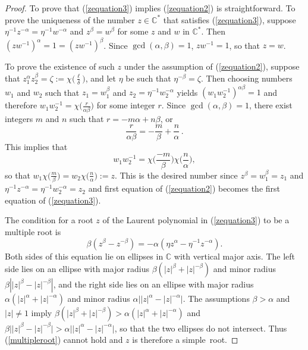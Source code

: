 \documentclass[12pt]{article}
\newcommand{\CC}{\mathbb{C}}
\newcommand{\cchi}[1]{{\textstyle{\chi\big(#1\big)}}}
\begin{document}
\begin{proof}
To prove that (\ref{zequation3}) implies (\ref{zequation2}) is straightforward.
  To prove the uniqueness of the number $z\in\CC^*$ that satisfies (\ref{zequation3}), suppose $\eta^{-1}z^{-\alpha}=\eta^{-1}w^{-\alpha}$ and $z^\beta=w^\beta$ for some $z$ and $w$ in $\CC^*$.  Then $(zw^{-1})^\alpha=1=(zw^{-1})^\beta$.  Since $\gcd(\alpha,\beta)=1$, $zw^{-1}=1$, so that $z=w$.
  
  To prove the existence of such $z$ under the assumption of (\ref{zequation2}), suppose that $z_1^\alpha z_2^\beta=\zeta:=\cchi{\frac{\ell}{\delta}}$, and let $\eta$ be such that $\eta^{-\beta}=\zeta$.  Then choosing numbers $w_1$ and $w_2$ such that $z_1=w_1^\beta$ and $z_2=\eta^{-1}w_2^{-\alpha}$ yields $(w_1w_2^{-1})^{\alpha\beta}=1$ and therefore $w_1w_2^{-1}=\cchi{\frac{r}{\alpha\beta}}$ for some integer $r$.  Since $\gcd(\alpha,\beta)=1$, there exist integers $m$ and $n$ such that $r=-m\alpha + n\beta$, or
%
\begin{equation}
  \frac{r}{\alpha\beta} = -\frac{m}{\beta} + \frac{n}{\alpha}\,.
\end{equation}
%
This implies that
%
\begin{equation}
  w_1w_2^{-1} = \cchi{\frac{-m}{\beta}} \cchi{\frac{n}{\alpha}},
\end{equation}
%
so that $w_1\cchi{\frac{m}{\beta}}=w_2\cchi{\frac{n}{\alpha}}:=z$.  This is the desired number since
$z^\beta=w_1^\beta=z_1$ and $\eta^{-1}z^{-\alpha}=\eta^{-1}w_2^{-\alpha} = z_2$ and first equation of (\ref{zequation2}) becomes the first equation of (\ref{zequation3}).

The condition for a root $z$ of the Laurent polynomial in (\ref{zequation3}) to be a multiple root is
%
\begin{equation}\label{multipleroot}
  \beta\left( z^\beta - z^{-\beta} \right) = -\alpha\left( \eta z^\alpha - \eta^{-1} z^{-\alpha} \right).
\end{equation}
%
Both sides of this equation lie on ellipses in $\CC$ with vertical major axis.
The left side lies on an ellipse with major radius $\beta\left( |z|^\beta + |z|^{-\beta} \right)$ and minor radius $\beta\left| |z|^\beta - |z|^{-\beta} \right|$, and the right side lies on an ellipse with major radius $\alpha\left( |z|^\alpha + |z|^{-\alpha} \right)$ and minor radius $\alpha\big| |z|^\alpha - |z|^{-\alpha} \big|$.  The assumptions $\beta>\alpha$ and $|z|\not=1$ imply
$\beta\left( |z|^\beta + |z|^{-\beta} \right)>\alpha\left( |z|^\alpha + |z|^{-\alpha} \right)$
and $\beta\big| |z|^\beta - |z|^{-\beta} \big|>\alpha\big| |z|^\alpha - |z|^{-\alpha} \big|$,
so that the two ellipses do not intersect.  Thus (\ref{multipleroot}) cannot hold and $z$ is therefore a simple~root.
\end{proof}
\end{document}

